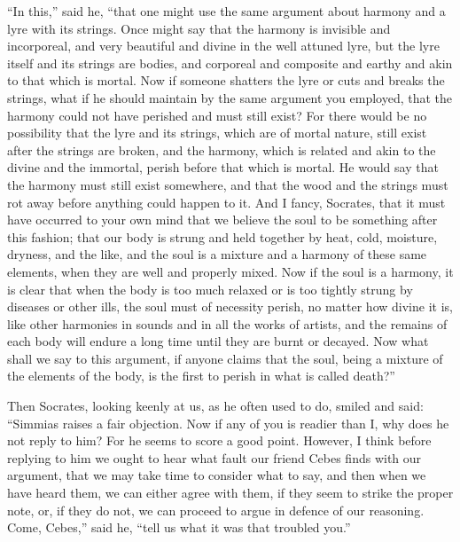 \documentclass[letterpaper,12pt]{article}
\newcommand{\stephpag}[1]{\marginnote{\small\itshape\fontfamily{ppl}\selectfont #1}}
\begin{document}
\begin{drama}
``In this,'' said he, ``that one might use the same argument about harmony and a lyre with its strings. Once might say that the harmony is invisible and incorporeal, and very beautiful and \stephpag{86 a} divine in the well attuned lyre, but the lyre itself and its strings are bodies, and corporeal and composite and earthy and akin to that which is mortal. Now if someone shatters the lyre or cuts and breaks the strings, what if he should maintain by the same argument you employed, that the harmony could not have perished and must still exist? For there would be no possibility that the lyre and its strings, which are of mortal nature, still exist after the strings are broken, and the harmony, \stephpag{b} which is related and akin to the divine and the immortal, perish before that which is mortal. He would say that the harmony must still exist somewhere, and that the wood and the strings must rot away before anything could happen to it. And I fancy, Socrates, that it must have occurred to your own mind that we believe the soul to be something after this fashion; that our body is strung and held together by heat, cold, moisture, dryness, and the like, \stephpag{c} and the soul is a mixture and a harmony of these same elements, when they are well and properly mixed. Now if the soul is a harmony, it is clear that when the body is too much relaxed or is too tightly strung by diseases or other ills, the soul must of necessity perish, no matter how divine it is, like other harmonies in sounds and in all the works of artists, and the remains of each body will endure \stephpag{d} a long time until they are burnt or decayed. Now what shall we say to this argument, if anyone claims that the soul, being a mixture of the elements of the body, is the first to perish in what is called death?''
 
Then Socrates, looking keenly at us, as he often used to do, smiled and said: ``Simmias raises a fair objection. Now if any of you is readier than I, why does he not reply to him? For he seems to score a good point. However, I think \stephpag{e} before replying to him we ought to hear what fault our friend Cebes finds with our argument, that we may take time to consider what to say, and then when we have heard them, we can either agree with them, if they seem to strike the proper note, or, if they do not, we can proceed to argue in defence of our reasoning. Come, Cebes,'' said he, ``tell us what it was that troubled you.''
 

\end{drama}
\end{document}
